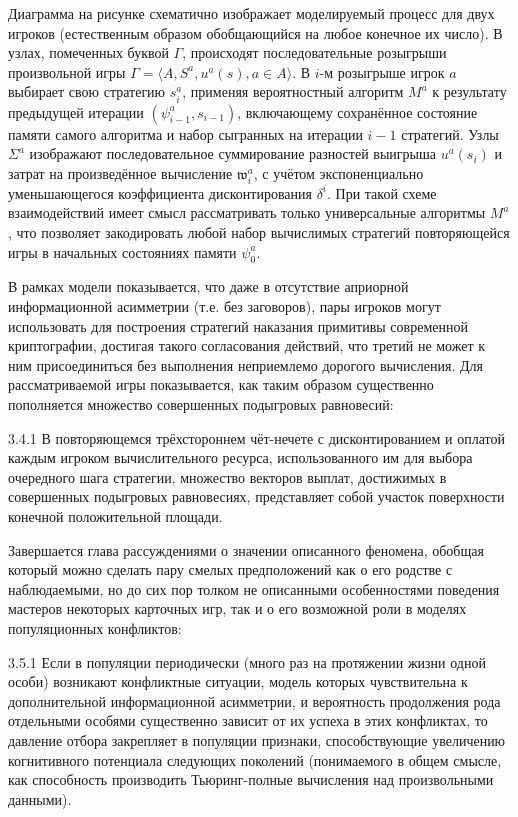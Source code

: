 Диаграмма на рисунке схематично изображает моделируемый процесс для двух игроков (естественным образом обобщающийся на любое конечное их число). В узлах, помеченных буквой $\Gamma$, происходят последовательные розыгрыши произвольной игры $\Gamma = \langle A, S^a, u^a(s), a \in A \rangle$. В $i$-м розыгрыше игрок $a$ выбирает свою стратегию $s^a_i$, применяя вероятностный алгоритм $M^a$ к результату предыдущей итерации $(\psi^a_{i-1}, s_{i-1})$, включающему сохранённое состояние памяти самого алгоритма и набор сыгранных на итерации $i-1$ стратегий. Узлы $\Sigma^a$ изображают последовательное суммирование разностей выигрыша $u^a(s_i)$ и затрат на произведённое вычисление $\mathfrak{w}^a_i$, с учётом экспоненциально уменьшающегося коэффициента дисконтирования $\delta^i$. При такой схеме взаимодействий имеет смысл рассматривать только универсальные алгоритмы $M^a$, что позволяет закодировать любой набор вычислимых стратегий повторяющейся игры в начальных состояниях памяти $\psi^a_0$.

В рамках модели показывается, что даже в отсутствие априорной информационной асимметрии (т.е. без заговоров), пары игроков могут использовать для построения стратегий наказания примитивы современной криптографии, достигая такого согласования действий, что третий не может к ним присоединиться без выполнения неприемлемо дорогого вычисления. Для рассматриваемой игры показывается, как таким образом существенно пополняется множество совершенных подыгровых равновесий:
\begin{theorem}{3.4.1}
	В повторяющемся трёхстороннем чёт-нечете с дисконтированием и оплатой каждым игроком вычислительного ресурса, использованного им для выбора очередного шага стратегии, множество векторов выплат, достижимых в совершенных подыгровых равновесиях, представляет собой участок поверхности конечной положительной площади.
\end{theorem}

Завершается глава рассуждениями о значении описанного феномена, обобщая который можно сделать пару смелых предположений как о его родстве с наблюдаемыми, но до сих пор толком не описанными особенностями поведения мастеров некоторых карточных игр, так и о его возможной роли в моделях популяционных конфликтов:
\begin{conjecture}{3.5.1}
	Если в популяции периодически (много раз на протяжении жизни одной особи) возникают конфликтные ситуации, модель которых чувствительна к дополнительной информационной асимметрии, и вероятность продолжения рода отдельными особями существенно зависит от их успеха в этих конфликтах, то давление отбора закрепляет в популяции признаки, способствующие увеличению когнитивного потенциала следующих поколений (понимаемого в общем смысле, как способность производить Тьюринг-полные вычисления над произвольными данными).
\end{conjecture}

